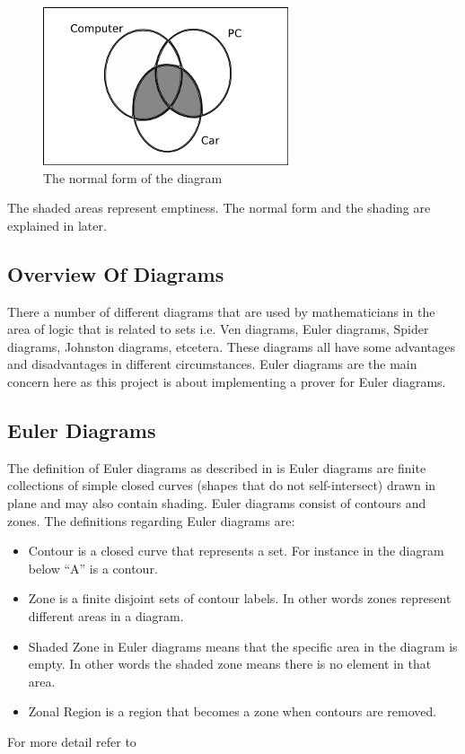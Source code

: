 \documentclass[a4paper]{article}
\begin{document}
\begin{figure}[h]
\centering
\includegraphics{images/diag2_22.png}
\caption{The normal form of the diagram}
\end{figure}

The shaded areas represent emptiness. The normal form and the shading are explained in later.

\subsection{Overview Of Diagrams}
There a number of different diagrams that are used by mathematicians in the area of logic that is related to sets i.e. Ven diagrams, Euler diagrams, Spider diagrams, Johnston diagrams, etcetera. These diagrams all have some advantages and disadvantages in different circumstances. Euler diagrams are the main concern here as this project is about implementing a prover for Euler diagrams. 

\subsection{Euler Diagrams}

The definition of Euler diagrams as described in \cite{Fish_2007} is Euler diagrams are finite collections of simple closed curves (shapes that do not self-intersect) drawn in plane and may also contain shading. Euler diagrams consist of contours and zones. The definitions regarding Euler diagrams are:
\begin{itemize}
\item Contour is a closed curve that represents a set. For instance in the diagram below “A” is a contour.
\item Zone is a finite disjoint sets of contour labels. In other words zones represent different areas in a diagram.
\item Shaded Zone in Euler diagrams means that the specific area in the diagram is empty. In other words the shaded zone means there is no element in that area.
\item Zonal Region is a region that becomes a zone when contours are removed. 
\end{itemize}
For more detail refer to \cite{Fish_2007}
\end{document}
